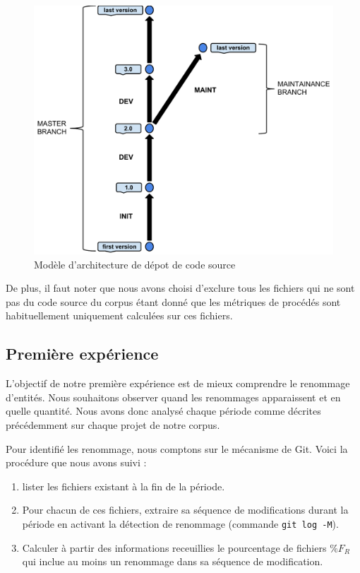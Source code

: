 \begin{figure}[h]
  \centering
  \includegraphics[scale=0.5]{data/figures/periods.pdf}
	\caption{Modèle d'architecture de dépot de code source}
	\label{fig:model}
\end{figure}

De plus, il faut noter que nous avons choisi d'exclure tous les fichiers qui ne sont pas du code source du corpus étant donné que les métriques de procédés sont habituellement uniquement calculées sur ces fichiers. \\

\subsection{Première expérience}

 L'objectif de notre première expérience est de mieux comprendre le renommage d'entités. Nous souhaitons observer quand les renommages apparaissent et en quelle quantité. Nous avons donc analysé chaque période comme décrites précédemment sur chaque projet de notre corpus. 

Pour identifié les renommage, nous comptons sur le mécanisme de Git. Voici la procédure que nous avons suivi :
\begin{enumerate}
\item lister les fichiers existant à la fin de la période.
\item Pour chacun de ces fichiers, extraire sa séquence de modifications durant la période en activant la détection de renommage (commande \texttt{git log -M}).
\item Calculer à partir des informations receuillies le pourcentage de fichiers $\%F_{R}$ qui inclue au moins un renommage dans sa séquence de modification.
\end{enumerate}
\medskip

